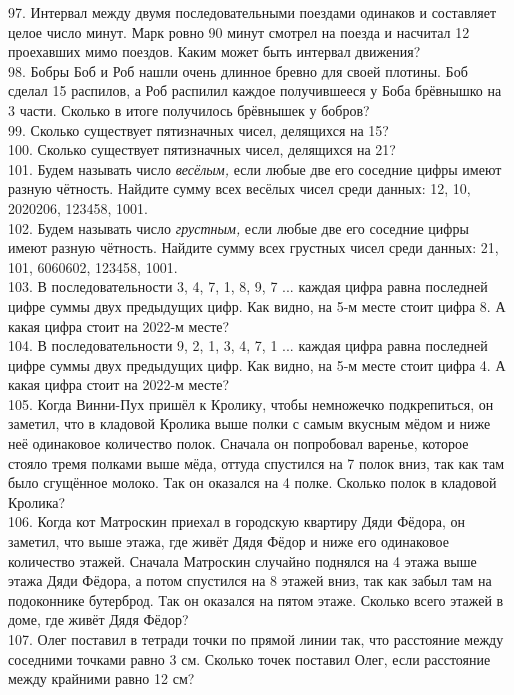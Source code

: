 \documentclass[12pt]{article}
\begin{document}
97. Интервал между двумя последовательными поездами одинаков и составляет целое число минут. Марк ровно 90 минут смотрел на поезда и насчитал 12 проехавших мимо поездов. Каким может быть интервал движения?\\
98. Бобры Боб и Роб нашли очень длинное бревно для своей плотины. Боб сделал 15 распилов, а Роб распилил каждое получившееся у Боба брёвнышко на 3 части. Сколько в итоге получилось брёвнышек у бобров?\\
99. Сколько существует пятизначных чисел, делящихся на 15?\\
100. Сколько существует пятизначных чисел, делящихся на 21?\\
101. Будем называть число {\it весёлым,} если любые две его соседние цифры имеют разную чётность. Найдите сумму всех весёлых чисел среди данных: 12, 10, 2020206, 123458, 1001.\\
102. Будем называть число {\it грустным,} если любые две его соседние цифры имеют разную чётность. Найдите сумму всех грустных чисел среди данных: 21, 101, 6060602, 123458, 1001.\\
103. В последовательности 3, 4, 7, 1, 8, 9, 7 ... каждая цифра равна последней цифре суммы двух предыдущих цифр. Как видно, на 5-м месте стоит цифра 8. А какая цифра стоит на 2022-м месте?\\
104. В последовательности 9, 2, 1, 3, 4, 7, 1 ... каждая цифра равна последней цифре суммы двух предыдущих цифр. Как видно, на 5-м месте стоит цифра 4. А какая цифра стоит на 2022-м месте?\\
105. Когда Винни-Пух пришёл к Кролику, чтобы немножечко подкрепиться, он заметил, что в кладовой Кролика выше полки с самым вкусным мёдом и ниже неё одинаковое количество полок. Сначала он попробовал варенье, которое стояло тремя полками выше мёда, оттуда спустился на 7 полок вниз, так как там было сгущённое молоко. Так он оказался на 4 полке. Сколько полок в кладовой Кролика?\\
106. Когда кот Матроскин приехал в городскую квартиру Дяди Фёдора, он заметил, что выше этажа, где живёт Дядя Фёдор и ниже его одинаковое количество этажей. Сначала Матроскин случайно поднялся на 4 этажа выше этажа Дяди Фёдора, а потом спустился на 8 этажей вниз, так как забыл там на подоконнике бутерброд. Так он оказался на пятом этаже. Сколько всего этажей в доме, где живёт Дядя Фёдор?\\
107. Олег поставил в тетради точки по прямой линии так, что расстояние между соседними точками равно 3 см. Сколько точек поставил Олег, если расстояние между крайними равно 12 см?\\
\end{document}
